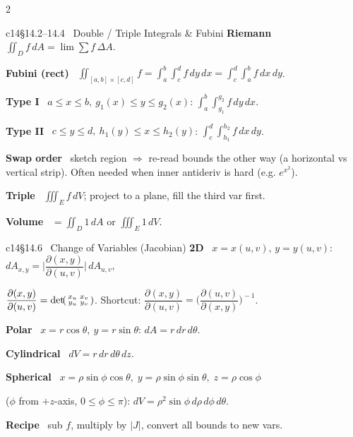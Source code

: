 \documentclass[10pt]{extarticle}
\newcommand{\h}[1]{{\bfseries #1}\ }
\newcommand{\key}[1]{\colorbox{hl}{$#1$}}
\begin{document}
\begin{multicols}{2}
\begin{tbox}{c14}{§14.2--14.4 \ Double / Triple Integrals \& Fubini}
\h{Riemann} $\displaystyle\iint_D f\,dA=\lim\sum f\,\Delta A$.\par
\h{Fubini (rect)} $\displaystyle\iint_{[a,b]\times[c,d]}\! f=\int_a^b\!\!\int_c^d f\,dy\,dx=\int_c^d\!\!\int_a^b f\,dx\,dy$.\par
\h{Type I} $a\le x\le b,\ g_1(x)\le y\le g_2(x)$: $\displaystyle\int_a^b\!\!\int_{g_1}^{g_2}\! f\,dy\,dx$.\par
\h{Type II} $c\le y\le d,\ h_1(y)\le x\le h_2(y)$: $\displaystyle\int_c^d\!\!\int_{h_1}^{h_2}\! f\,dx\,dy$.\par
\h{Swap order} sketch region $\Rightarrow$ re-read bounds the other way (a horizontal vs vertical strip). Often needed when inner antideriv is hard (e.g. $e^{x^2}$).\par
\h{Triple} $\displaystyle\iiint_E f\,dV$; project to a plane, fill the third var first.\par
\h{Volume} $=\iint_D 1\,dA$ or $\iiint_E 1\,dV$.
\end{tbox}

\begin{tbox}{c14}{§14.6 \ Change of Variables (Jacobian)}
\h{2D} $x=x(u,v),\,y=y(u,v)$:\quad $dA_{x,y}=\Big|\dfrac{\partial(x,y)}{\partial(u,v)}\Big|\,dA_{u,v}$,\par
$\dfrac{\partial(x,y)}{\partial(u,v)}=\det\!\begin{psmallmatrix} x_u&x_v\\ y_u&y_v\end{psmallmatrix}$.\quad
Shortcut: $\dfrac{\partial(x,y)}{\partial(u,v)}=\Big(\dfrac{\partial(u,v)}{\partial(x,y)}\Big)^{\!-1}$.\par
\h{Polar} $x=r\cos\theta,\ y=r\sin\theta$:\;\; $dA=r\,dr\,d\theta$.\par
\h{Cylindrical} $dV=r\,dr\,d\theta\,dz$.\par
\h{Spherical} $x=\rho\sin\phi\cos\theta,\;y=\rho\sin\phi\sin\theta,\;z=\rho\cos\phi$\par
($\phi$ from $+z$-axis, $0\!\le\!\phi\!\le\!\pi$): \quad\key{dV=\rho^{2}\sin\phi\,d\rho\,d\phi\,d\theta}.\par
\h{Recipe} sub $f$, multiply by $|J|$, convert all bounds to new vars.
\end{tbox}


\end{multicols}
\end{document}
